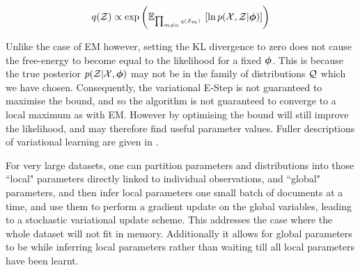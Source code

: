 \begin{align}
q({ \mathcal{Z} }) \propto \exp\left( { \mathbb{E}_{ { {{ \mbox{\tiny ${\prod_{m\neq n} q({ \mathcal{Z} }_m)}$ } }} } }\left[ { \ln { p( { \mathcal{X} } ,  { \mathcal{Z} } |  {  \bm \phi  } ) } } \right] }  \right)
\end{align}

Unlike the case of EM however, setting the KL divergence to zero does not cause the free-energy to become equal to the likelihood for a fixed ${ \bm \phi }$. This is because the true posterior $p({ \mathcal{Z} } | { \mathcal{X} }, { \bm \phi })$ may not be in the family of distributions ${ \mathcal{Q} }$ which we have chosen. Consequently, the variational E-Step is not guaranteed to maximise the bound, and so the algorithm is not guaranteed to converge to a local maximum as with EM. However by optimising the bound will still improve the likelihood, and may therefore find useful parameter values. Fuller descriptions of variational learning are given in \cite{Jordan1999a}\cite{Bishop2006}\cite{Tzikas2008}. 

For very large datasets, one can partition parameters and distributions into those ``local" parameters directly linked to individual observations, and ``global" parameters, and then infer local parameters one small batch of documents at a time, and use them to perform a gradient update\cite{RobbinsMonro1951} on the global variables, leading to a stochastic variational update scheme\cite{Hoffman2012}. This addresses the case where the whole dataset will not fit in memory. Additionally it allows for global parameters to be while inferring local parameters rather than waiting till all local parameters have been learnt.
 
